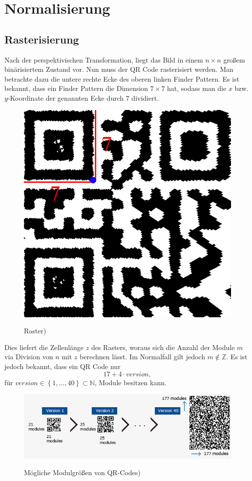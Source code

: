 \chapter{Normalisierung}

\section{Rasterisierung}
Nach der perspektivischen Transformation, liegt das Bild in einem $n\times n$ großem binärisiertem Zustand vor. Nun muss der QR Code rasterisiert werden. 
Man betrachte dazu die untere rechte Ecke des oberen linken Finder Pattern. Es ist bekannt, dass ein Finder Pattern die Dimension $7 \times 7$ hat,
sodass man die $x$ bzw. $y$-Koordinate der genannten Ecke durch $7$ dividiert.
\begin{figure}[h]
\centering
\includegraphics[scale=0.3]{images/Gitter_step.png}
\label{fig:raster-qrcode}\caption{Raster)}
\end{figure}

Dies liefert die Zellenlänge $z$ des Rasters,
woraus sich die Anzahl der Module $m$ via Division von $n$ mit $z$ berechnen lässt. Im Normalfall gilt jedoch $m \notin \mathbb{Z}$.
Es ist jedoch bekannt, dass ein QR Code nur 
\begin {equation}
	17 + 4 \cdot version,
\end{equation}
für $version \in \left\{1, ..., 40\right\} \subset \mathbb{N}$, Module besitzen kann. 
\begin{figure}[h]
\centering
\includegraphics[scale=0.4]{images/QRVersion.png}
\label{fig:version-qrcode}\caption{Mögliche Modulgrößen von QR-Codes)}
\end{figure}

